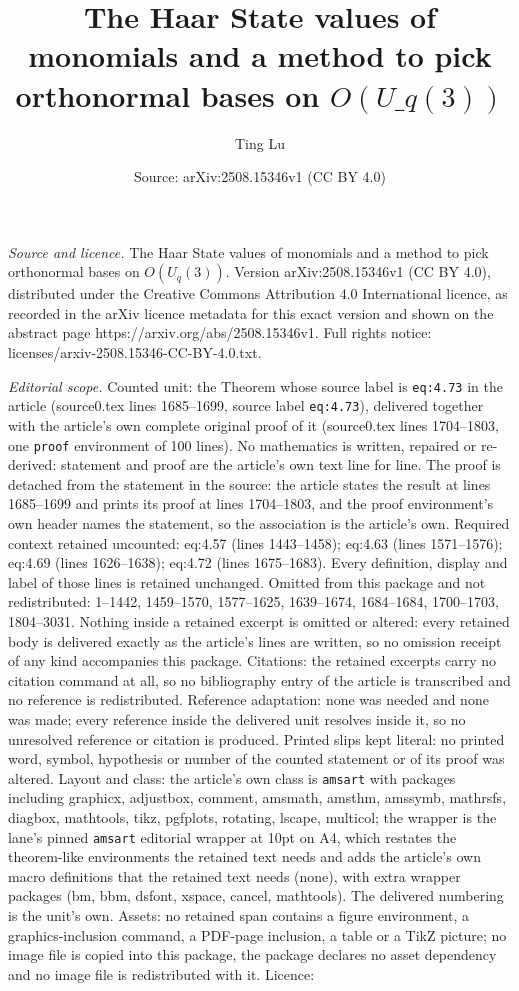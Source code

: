 \documentclass[10pt,a4paper]{amsart}
\title[The Haar State values of monomials and a method to pick orth]{The Haar State values of monomials and a method to pick orthonormal bases on $O(U\_q(3))$}
\author{Ting Lu}
\date{Source: arXiv:2508.15346v1 (CC BY 4.0)}
\begin{document}
\maketitle

\noindent\emph{Source and licence.} The Haar State values of monomials and a method to pick orthonormal bases on $O(U_q(3))$. Version arXiv:2508.15346v1 (CC BY 4.0), distributed under the Creative Commons Attribution 4.0 International licence, as recorded in the arXiv licence metadata for this exact version and shown on the abstract page https://arxiv.org/abs/2508.15346v1. Full rights notice: licenses/arxiv-2508.15346-CC-BY-4.0.txt.\par\smallskip

\noindent\textit{Editorial scope.} Counted unit: the Theorem whose source label is \texttt{eq:4.73} in the article (source0.tex lines 1685--1699, source label \texttt{eq:4.73}), delivered together with the article's own complete original proof of it (source0.tex lines 1704--1803, one \texttt{proof} environment of 100 lines). No mathematics is written, repaired or re-derived: statement and proof are the article's own text line for line. The proof is detached from the statement in the source: the article states the result at lines 1685--1699 and prints its proof at lines 1704--1803, and the proof environment's own header names the statement, so the association is the article's own. Required context retained uncounted: eq:4.57 (lines 1443--1458); eq:4.63 (lines 1571--1576); eq:4.69 (lines 1626--1638); eq:4.72 (lines 1675--1683). Every definition, display and label of those lines is retained unchanged. Omitted from this package and not redistributed: 1--1442, 1459--1570, 1577--1625, 1639--1674, 1684--1684, 1700--1703, 1804--3031. Nothing inside a retained excerpt is omitted or altered: every retained body is delivered exactly as the article's lines are written, so no omission receipt of any kind accompanies this package. Citations: the retained excerpts carry no citation command at all, so no bibliography entry of the article is transcribed and no reference is redistributed. Reference adaptation: none was needed and none was made; every reference inside the delivered unit resolves inside it, so no unresolved reference or citation is produced. Printed slips kept literal: no printed word, symbol, hypothesis or number of the counted statement or of its proof was altered. Layout and class: the article's own class is \texttt{amsart} with packages including graphicx, adjustbox, comment, amsmath, amsthm, amssymb, mathrsfs, diagbox, mathtools, tikz, pgfplots, rotating, lscape, multicol; the wrapper is the lane's pinned \texttt{amsart} editorial wrapper at 10pt on A4, which restates the theorem-like environments the retained text needs and adds the article's own macro definitions that the retained text needs (none), with extra wrapper packages (bm, bbm, dsfont, xspace, cancel, mathtools). The delivered numbering is the unit's own. Assets: no retained span contains a figure environment, a graphics-inclusion command, a PDF-page inclusion, a table or a TikZ picture; no image file is copied into this package, the package declares no asset dependency and no image file is redistributed with it. Licence: 
\end{document}
